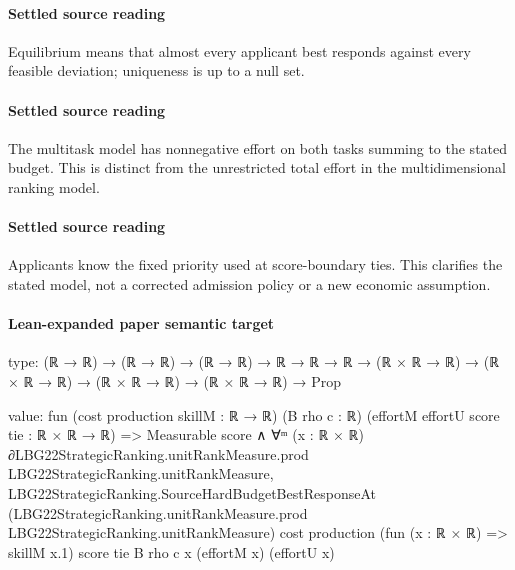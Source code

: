 \documentclass[10pt]{article}
\begin{document}
\paragraph{Settled source reading}
\begin{sloppypar}
Equilibrium means that almost every applicant best responds against every feasible deviation;\allowbreak{} uniqueness is up to a null set.\allowbreak{}
\end{sloppypar}
\paragraph{Settled source reading}
\begin{sloppypar}
The multitask model has nonnegative effort on both tasks summing to the stated budget.\allowbreak{} This is distinct from the unrestricted total effort in the multidimensional ranking model.\allowbreak{}
\end{sloppypar}
\paragraph{Settled source reading}
\begin{sloppypar}
Applicants know the fixed priority used at score-\allowbreak{}boundary ties.\allowbreak{} This clarifies the stated model, not a corrected admission policy or a new economic assumption.\allowbreak{}
\end{sloppypar}

\paragraph{Lean-expanded paper semantic target}
\begin{ReviewVerbatim}
type:
(ℝ → ℝ) → (ℝ → ℝ) → (ℝ → ℝ) → ℝ → ℝ → ℝ → (ℝ × ℝ → ℝ) → (ℝ × ℝ → ℝ) → (ℝ × ℝ → ℝ) → (ℝ × ℝ → ℝ) → Prop

value:
fun (cost production skillM : ℝ → ℝ) (B rho c : ℝ) (effortM effortU score tie : ℝ × ℝ → ℝ) =>
  Measurable score ∧
    ∀ᵐ (x : ℝ × ℝ) ∂LBG22StrategicRanking.unitRankMeasure.prod LBG22StrategicRanking.unitRankMeasure,
      LBG22StrategicRanking.SourceHardBudgetBestResponseAt
        (LBG22StrategicRanking.unitRankMeasure.prod LBG22StrategicRanking.unitRankMeasure) cost production
        (fun (x : ℝ × ℝ) => skillM x.1) score tie B rho c x (effortM x) (effortU x)
\end{ReviewVerbatim}
\end{document}
